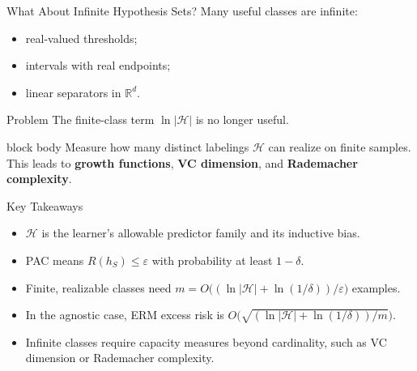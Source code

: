 \documentclass[aspectratio=169,10pt]{beamer}
\newcommand{\Hc}{\mathcal{H}}
\newcommand{\eps}{\varepsilon}
\begin{document}
\begin{frame}[t]{What About Infinite Hypothesis Sets?}
  \vspace{0.04cm}
  Many useful classes are infinite:
  \begin{itemize}
    \setlength{\itemsep}{0.16cm}
    \item real-valued thresholds;
    \item intervals with real endpoints;
    \item linear separators in $\mathbb{R}^d$.
  \end{itemize}
  \vspace{0.08cm}
  \begin{alertblock}{Problem}
    The finite-class term $\ln|\Hc|$ is no longer useful.
  \end{alertblock}
  \vspace{0.10cm}
  \begin{beamercolorbox}[rounded=true,sep=0.18cm,wd=0.92\linewidth,center]{block body}
    Measure how many distinct labelings $\Hc$ can realize on finite samples. This leads to \textbf{growth functions}, \textbf{VC dimension}, and \textbf{Rademacher complexity}.
  \end{beamercolorbox}
\end{frame}

\begin{frame}[t]{Key Takeaways}
  \vspace{0.10cm}
  {\fontsize{14}{17.5}\selectfont
  \begin{itemize}
    \setlength{\itemsep}{0.28cm}
    \item $\Hc$ is the learner's allowable predictor family and its inductive bias.
    \item PAC means $R(h_S)\le\eps$ with probability at least $1-\delta$.
    \item Finite, realizable classes need
      $m=O\!\bigl((\ln|\Hc|+\ln(1/\delta))/\eps\bigr)$ examples.
    \item In the agnostic case, ERM excess risk is
      $O\!\bigl(\sqrt{(\ln|\Hc|+\ln(1/\delta))/m}\bigr)$.
    \item Infinite classes require capacity measures beyond cardinality, such as VC dimension or Rademacher complexity.
  \end{itemize}}
\end{frame}
\end{document}
